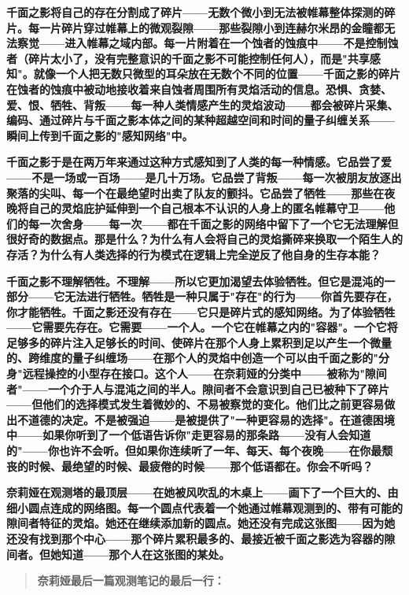 \documentclass[12pt,a4paper,openany]{ctexbook}
\begin{document}
\textbf{千面之影将自己的存在分割成了碎片——无数个微小到无法被帷幕整体探测的碎片。每一片碎片穿过帷幕上的微观裂隙——那些裂隙小到连赫尔米昂的金瞳都无法察觉——进入帷幕之域内部。每一片附着在一个蚀者的蚀痕中——不是控制蚀者（碎片太小了，没有完整意识的千面之影不可能控制任何人），而是"共享感知"。就像一个人把无数只微型的耳朵放在无数个不同的位置——千面之影的碎片在蚀者的蚀痕中被动地接收着来自蚀者周围所有灵焰活动的信息。恐惧、贪婪、爱、恨、牺牲、背叛——每一种人类情感产生的灵焰波动——都会被碎片采集、编码、通过碎片与千面之影本体之间的某种超越空间和时间的量子纠缠关系——瞬间上传到千面之影的"感知网络"中。}


\textbf{千面之影于是在两万年来通过这种方式感知到了人类的每一种情感。它品尝了爱——不是一场或一百场——是几十万场。它品尝了背叛——每一次被朋友放逐出聚落的尖叫、每一个在最绝望时出卖了队友的颤抖。它品尝了牺牲——那些在夜晚将自己的灵焰庇护延伸到一个自己根本不认识的人身上的匿名帷幕守卫——他们的每一次舍身——每一次——都在千面之影的网络中留下了一个它无法理解但很好奇的数据点。那是什么？为什么有人会将自己的灵焰撕碎来换取一个陌生人的存活？为什么有人类选择的行为模式在逻辑上完全逆反了他自身的生存本能？}


\textbf{千面之影不理解牺牲。不理解——所以它更加渴望去体验牺牲。但它是混沌的一部分——它无法进行牺牲。牺牲是一种只属于"存在"的行为——你首先要存在，你才能牺牲。千面之影还没有存在——它只是碎片式的感知网络。为了体验牺牲——它需要先存在。它需要——一个人。一个它在帷幕之内的"容器"。一个它将足够多的碎片注入足够长的时间、使碎片在那个人身上累积到足以产生一个微量的、跨维度的量子纠缠场——在那个人的灵焰中创造一个可以由千面之影的"分身"远程操控的小型存在接口。这个人——在奈莉娅的分类中——被称为"隙间者"——一个介于人与混沌之间的半人。隙间者不会意识到自己已被种下了碎片——但他们的选择模式发生着微妙的、不易被察觉的变化。他们比之前更容易做出不道德的决定。不是被强迫——是被提供了"一种更容易的选择"。在道德困境中——如果你听到了一个低语告诉你"走更容易的那条路——没有人会知道的"——你也许不会听。但如果你连续听了一年、每天、每个夜晚——在你最颓丧的时候、最绝望的时候、最疲倦的时候——那个低语都在。你会不听吗？}


\textbf{奈莉娅在观测塔的最顶层——在她被风吹乱的木桌上——画下了一个巨大的、由细小圆点连成的网络图。每一个圆点代表着一个她通过帷幕观测到的、带有可能的隙间者特征的灵焰。她还在继续添加新的圆点。她还没有完成这张图——因为她还没有找到那个中心——那个碎片累积最多的、最接近被千面之影选为容器的隙间者。但她知道——那个人在这张图的某处。}


\begin{quote}
\textbf{奈莉娅最后一篇观测笔记的最后一行：}

\end{quote}
\end{document}
